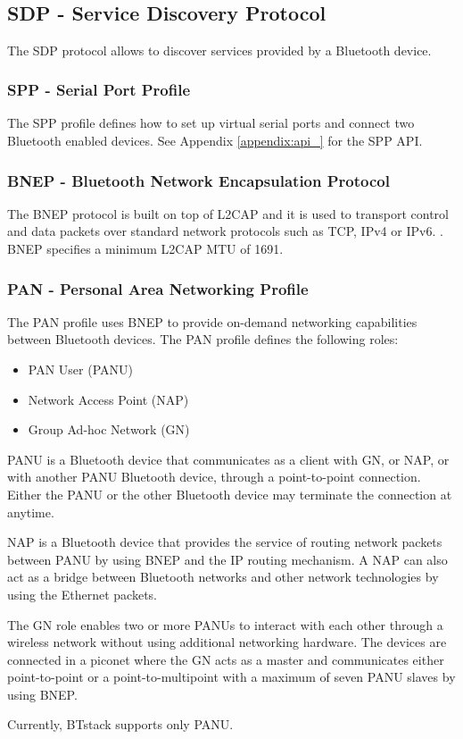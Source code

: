\\
\\
\\
\\

\subsection{SDP - Service Discovery Protocol}
The SDP protocol allows to discover services provided by a Bluetooth device. 

\subsubsection{SPP - Serial Port Profile}
The SPP profile defines how to set up virtual serial ports and connect two Bluetooth enabled devices. See Appendix \ref{appendix:api_} for the SPP API.

\subsubsection{BNEP -  Bluetooth Network Encapsulation Protocol}
The BNEP protocol is built on top of L2CAP and it is used to transport control and data packets over standard network protocols such as TCP, IPv4 or IPv6.  . BNEP specifies a minimum L2CAP MTU of 1691. 

\subsubsection{PAN -  Personal Area Networking Profile}
The PAN profile uses BNEP to provide on-demand networking capabilities between Bluetooth devices. The PAN profile defines the following roles:
\begin{itemize}
\item PAN User (PANU)
\item Network Access Point (NAP)
\item Group Ad-hoc Network (GN)
\end{itemize}

PANU is a Bluetooth device that communicates as a client with GN, or NAP, or with another PANU Bluetooth device, through a point-to-point connection. Either the PANU or the other Bluetooth device may terminate the connection at anytime.

NAP is a Bluetooth device that provides the service of routing network packets between PANU by using BNEP and the IP routing mechanism. A NAP can also act as a bridge between Bluetooth networks and other network technologies by using the Ethernet packets.

The GN role enables two or more PANUs to interact with each other through a wireless network without using additional networking hardware. The devices are connected in a piconet where the GN acts as a master and communicates either point-to-point or a point-to-multipoint with a maximum of seven PANU slaves by using BNEP.

Currently, BTstack supports only PANU.
